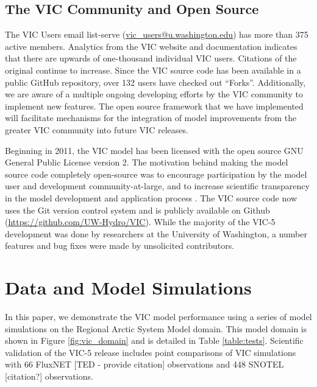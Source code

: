 \documentclass[gmd, manuscript]{copernicus}
\begin{document}
  \subsection{The VIC Community and Open Source}
    \label{sec:vic_community}
    The VIC Users email list-serve (\url{vic_users@u.washington.edu}) has more than 375 active members.
    Analytics from the VIC website and documentation indicates that there are upwards of one-thousand individual VIC users.
    Citations of the original \citep{Liang_1994} continue to increase.
    Since the VIC source code has been available in a public GitHub repository, over 132 users have checked out ``Forks''.
    Additionally, we are aware of a multiple ongoing developing efforts by the VIC community to implement new features.
    The open source framework that we have implemented will facilitate mechanisms for the integration of model improvements from the greater VIC community into future VIC releases.

    Beginning in 2011, the VIC model has been licensed with the open source GNU General Public License version 2.
    The motivation behind making the model source code completely open-source was to encourage participation by the model user and development community-at-large, and to increase scientific transparency in the model development and application process \citep{Ince_2012}.
    The VIC source code now uses the Git version control system \citep{Torvalds_2010} and is publicly available on Github (\url{https://github.com/UW-Hydro/VIC}).
    While the majority of the VIC-5 development was done by researchers at the University of Washington, a number features and bug fixes were made by unsolicited contributors.

\section{Data and Model Simulations}
  \label{sec:data_and_sims}
  In this paper, we demonstrate the VIC model performance using a series of model simulations on the Regional Arctic System Model domain.
  This model domain is shown in Figure \ref{fig:vic_domain} and is detailed in Table \ref{table:tests}.
  Scientific validation of the VIC-5 release includes point comparisons of VIC simulations with 66 FluxNET [TED - provide citation] observations and 448 SNOTEL [citation?] observations.
\end{document}
